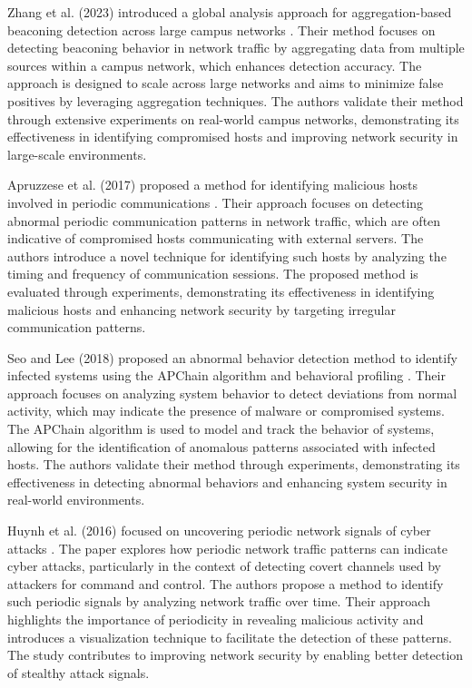Zhang et al. (2023) introduced a global analysis approach for aggregation-based beaconing detection across large campus networks \cite{zhang2023global}. Their method focuses on detecting beaconing behavior in network traffic by aggregating data from multiple sources within a campus network, which enhances detection accuracy. The approach is designed to scale across large networks and aims to minimize false positives by leveraging aggregation techniques. The authors validate their method through extensive experiments on real-world campus networks, demonstrating its effectiveness in identifying compromised hosts and improving network security in large-scale environments.

Apruzzese et al. (2017) proposed a method for identifying malicious hosts involved in periodic communications \cite{apruzzese2017identifying}. Their approach focuses on detecting abnormal periodic communication patterns in network traffic, which are often indicative of compromised hosts communicating with external servers. The authors introduce a novel technique for identifying such hosts by analyzing the timing and frequency of communication sessions. The proposed method is evaluated through experiments, demonstrating its effectiveness in identifying malicious hosts and enhancing network security by targeting irregular communication patterns.

Seo and Lee (2018) proposed an abnormal behavior detection method to identify infected systems using the APChain algorithm and behavioral profiling \cite{seo2018abnormal}. Their approach focuses on analyzing system behavior to detect deviations from normal activity, which may indicate the presence of malware or compromised systems. The APChain algorithm is used to model and track the behavior of systems, allowing for the identification of anomalous patterns associated with infected hosts. The authors validate their method through experiments, demonstrating its effectiveness in detecting abnormal behaviors and enhancing system security in real-world environments.

Huynh et al. (2016) focused on uncovering periodic network signals of cyber attacks \cite{huynh2016uncovering}. The paper explores how periodic network traffic patterns can indicate cyber attacks, particularly in the context of detecting covert channels used by attackers for command and control. The authors propose a method to identify such periodic signals by analyzing network traffic over time. Their approach highlights the importance of periodicity in revealing malicious activity and introduces a visualization technique to facilitate the detection of these patterns. The study contributes to improving network security by enabling better detection of stealthy attack signals.

